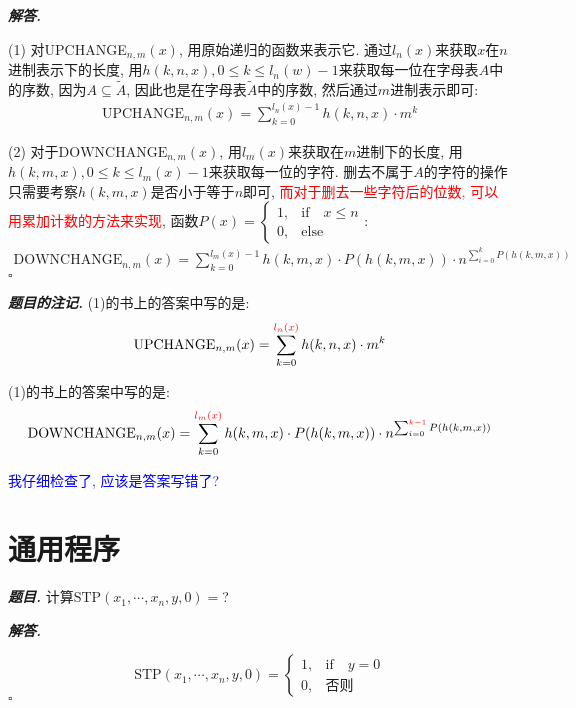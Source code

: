 \documentclass[10pt, a4paper, oneside]{ctexart}
\newenvironment{problem}{\begin{framed}\par\noindent\textbf{\textit{题目. }}}{\end{framed}\par}
\newenvironment{solution}{%
  \par\noindent\textbf{\textit{解答. }}\ignorespaces
}{%
  \hfill\ensuremath{\square}\par
}
\newenvironment{note}{\par\noindent\textbf{\textit{题目的注记. }}\ignorespaces}{\par}
\begin{document}
\begin{solution}
(1) 对UPCHANGE$_{n,m}(x)$, 用原始递归的函数来表示它. 通过$l_{n}(x)$来获取$x$在$n$进制表示下的长度, 用$h(k,n,x), 0\leq k\leq l_n(w)-1$来获取每一位在字母表$A$中的序数, 因为$A\subseteq \tilde{A}$, 因此也是在字母表$\tilde{A}$中的序数, 然后通过$m$进制表示即可:
\begin{align*}
    \text{UPCHANGE}_{n,m}(x)=\sum_{k=0}^{l_n(x)-1} h(k,n,x)\cdot m^{k}
\end{align*}

(2) 对于$\text{DOWNCHANGE}_{n,m}(x)$, 用$l_{m}(x)$来获取在$m$进制下的长度, 用$h(k,m,x), 0\leq k\leq l_m(x)-1$来获取每一位的字符. 删去不属于$A$的字符的操作只需要考察$h(k,m,x)$是否小于等于$n$即可, \textcolor{red}{而对于删去一些字符后的位数, 可以用累加计数的方法来实现}, 函数$P(x)=\begin{cases}
    1,&\text{if}\quad x\leq n\\
    0,&\text{else}
\end{cases}$:
\begin{align*}
    \text{DOWNCHANGE}_{n,m}(x)=\sum_{k=0}^{l_m(x)-1} h(k,m,x)\cdot P(h(k,m,x)) \cdot n^{\sum_{i=0}^{k} P(h(k,m,x))}
\end{align*}
\end{solution}

\begin{note}
(1)的书上的答案中写的是:
\begin{align*}
    \text{UPCHANGE}_{n,m}(x)=\sum_{k=0}^{\textcolor{red}{l_n(x)}} h(k,n,x)\cdot m^{k}
\end{align*}

(1)的书上的答案中写的是:
\begin{align*}
    \text{DOWNCHANGE}_{n,m}(x)=\sum_{k=0}^{ \textcolor{red}{l_m(x)} } h(k,m,x)\cdot P(h(k,m,x)) \cdot n^{\sum_{i=0}^{ \textcolor{red}{k-1} } P(h(k,m,x))}
\end{align*}

\textcolor{blue}{我仔细检查了, 应该是答案写错了?}
\end{note}

\section{通用程序}

\begin{problem}
计算$\text{STP}(x_1,\cdots,x_n,y,0)=$?
\end{problem}
\begin{solution}
    $$\text{STP}(x_1,\cdots,x_n,y,0)=\begin{cases}
        1, & \text{if}\quad y=0\\
        0, &\text{否则} 
    \end{cases}$$
\end{solution}
\end{document}
